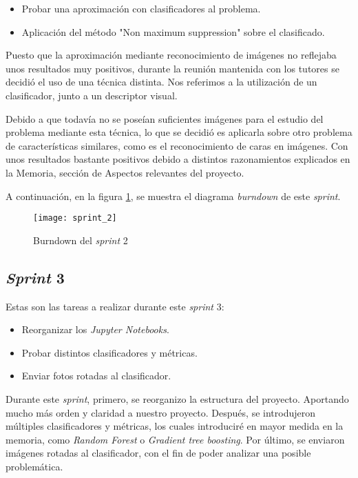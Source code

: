 \begin{itemize}
	\item Probar una aproximación con clasificadores al problema.
	\item Aplicación del método "Non maximum suppression" sobre el clasificado.
\end{itemize}

Puesto que la aproximación mediante reconocimiento de imágenes no reflejaba unos resultados muy positivos, durante la reunión mantenida con los tutores se decidió el uso de una técnica distinta. Nos referimos a la utilización  de un clasificador, junto a un descriptor visual.

Debido a que todavía no se poseían suficientes imágenes para el estudio del problema mediante esta técnica, lo que se decidió es aplicarla sobre otro problema de características similares, como es el reconocimiento de caras en imágenes. Con unos resultados bastante positivos debido a distintos razonamientos explicados en la Memoria, sección de Aspectos relevantes del proyecto.

A continuación, en la figura \ref{fig:A.1.3}, se muestra el diagrama \textit{burndown} de este \textit{sprint}.

\begin{figure}[h]
\centering
\texttt{[image: sprint\_2]}
\caption{Burndown del \textit{sprint} 2}
\label{fig:A.1.3}
\end{figure}

\subsection{\textit{Sprint} 3}
Estas son las tareas a realizar durante este \textit{sprint} 3:

\begin{itemize}
	\item Reorganizar los \textit{Jupyter Notebooks}.
	\item Probar distintos clasificadores y métricas.
	\item Enviar fotos rotadas al clasificador.
\end{itemize}

Durante este \textit{sprint}, primero, se reorganizo la estructura del proyecto. Aportando mucho más orden y claridad a nuestro proyecto. Después, se introdujeron múltiples clasificadores y métricas, los cuales introduciré en mayor medida en la memoria, como \textit{Random Forest} o \textit{Gradient tree boosting}. Por último, se enviaron imágenes rotadas al clasificador, con el fin de poder analizar una posible problemática.

